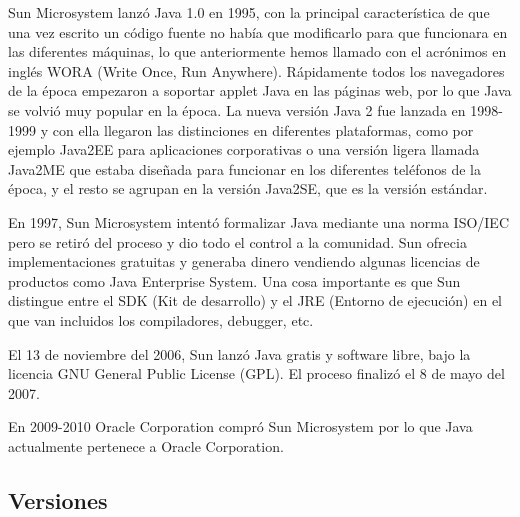Sun Microsystem lanzó Java 1.0 en 1995, con la principal característica de que una vez escrito un código fuente no había que modificarlo para que funcionara en las diferentes máquinas, lo que anteriormente hemos llamado con el acrónimos en inglés WORA (Write Once, Run Anywhere). Rápidamente todos los navegadores de la época empezaron a soportar applet Java en las páginas web, por lo que Java se volvió muy popular en la época. La nueva versión Java 2 fue lanzada en 1998-1999 y con ella llegaron las distinciones en diferentes plataformas, como por ejemplo Java2EE para aplicaciones corporativas o una versión ligera llamada Java2ME que estaba diseñada para funcionar en los diferentes teléfonos de la época, y el resto se agrupan en la versión Java2SE, que es la versión estándar.

En 1997, Sun Microsystem intentó formalizar Java mediante una norma ISO/IEC pero se retiró del proceso y dio todo el control a la comunidad. Sun ofrecia implementaciones gratuitas y generaba dinero vendiendo algunas licencias de productos como Java Enterprise System. Una cosa importante es que Sun distingue entre el SDK (Kit de desarrollo) y el JRE (Entorno de ejecución) en el que van incluidos los compiladores, debugger, etc.

El 13 de noviembre del 2006, Sun lanzó Java gratis y software libre, bajo la licencia GNU General Public License (GPL). El proceso finalizó el 8 de mayo del 2007.

En 2009-2010 Oracle Corporation compró Sun Microsystem por lo que Java actualmente pertenece a Oracle Corporation.

\subsection{Versiones}


